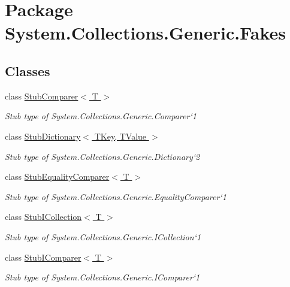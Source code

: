 \hypertarget{namespace_system_1_1_collections_1_1_generic_1_1_fakes}{\section{Package System.\-Collections.\-Generic.\-Fakes}
\label{namespace_system_1_1_collections_1_1_generic_1_1_fakes}
}
\subsection*{Classes}
\begin{DoxyCompactItemize}
\item 
class \hyperlink{class_system_1_1_collections_1_1_generic_1_1_fakes_1_1_stub_comparer_3_01_t_01_4}{Stub\-Comparer$<$ T $>$}
\begin{DoxyCompactList}\small\item\em Stub type of System.\-Collections.\-Generic.\-Comparer`1\end{DoxyCompactList}\item 
class \hyperlink{class_system_1_1_collections_1_1_generic_1_1_fakes_1_1_stub_dictionary_3_01_t_key_00_01_t_value_01_4}{Stub\-Dictionary$<$ T\-Key, T\-Value $>$}
\begin{DoxyCompactList}\small\item\em Stub type of System.\-Collections.\-Generic.\-Dictionary`2\end{DoxyCompactList}\item 
class \hyperlink{class_system_1_1_collections_1_1_generic_1_1_fakes_1_1_stub_equality_comparer_3_01_t_01_4}{Stub\-Equality\-Comparer$<$ T $>$}
\begin{DoxyCompactList}\small\item\em Stub type of System.\-Collections.\-Generic.\-Equality\-Comparer`1\end{DoxyCompactList}\item 
class \hyperlink{class_system_1_1_collections_1_1_generic_1_1_fakes_1_1_stub_i_collection_3_01_t_01_4}{Stub\-I\-Collection$<$ T $>$}
\begin{DoxyCompactList}\small\item\em Stub type of System.\-Collections.\-Generic.\-I\-Collection`1\end{DoxyCompactList}\item 
class \hyperlink{class_system_1_1_collections_1_1_generic_1_1_fakes_1_1_stub_i_comparer_3_01_t_01_4}{Stub\-I\-Comparer$<$ T $>$}
\begin{DoxyCompactList}\small\item\em Stub type of System.\-Collections.\-Generic.\-I\-Comparer`1\end{DoxyCompactList}\item 

\end{DoxyCompactItemize}
